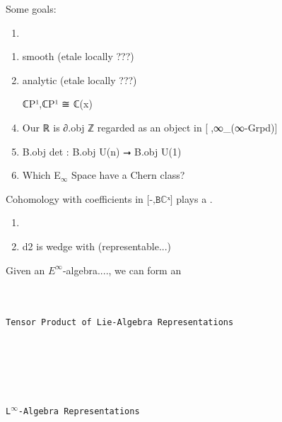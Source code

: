 \documentclass{book}
\theoremstyle{definition}
\renewcommand{\chapter}[1]{
\newpage
{
\Huge 
\begin{center}
\ \\
\ \\
\thispagestyle{empty}
\texttt{#1}
\end{center}}
\ \\
\ \\
}
\begin{document}

Some goals:
\begin{enumerate}
\item 
\end{enumerate}

\begin{enumerate}
\item smooth (etale locally ???)
\item analytic (etale locally ???)
\item [ℂP¹,ℂP¹] ≅ ℂ(x)
\item Our ℝ is ∂.obj ℤ regarded as an object in [γ⃗,∞\_(∞-Grpd)]
\item B.obj det : B.obj U(n) ⭢ B.obj U(1)
\item Which E${}_{\infty}$ Space have a Chern class?
\end{enumerate}

Cohomology with coefficients in $\texttt{[-,Bℂˣ]}$ plays a .\\

\begin{enumerate}
\item 
\item d2 is wedge with (representable...)
\end{enumerate}

Given an $E^{\infty}$-algebra...., we can form an \\

\newpage
\chapter{Tensor Product of Lie-Algebra Representations}




\newpage
\chapter{L${}^{\infty}$-Algebra Representations}
\end{document}
